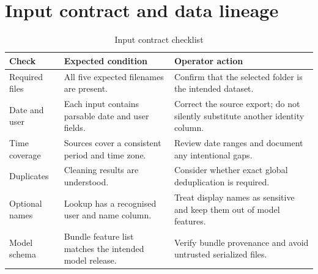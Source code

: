 \section{Input contract and data lineage}
\label{app:data-lineage}
\begin{table}[H]
\centering
\tablefont
\caption{Input contract checklist}
\label{tab:input-contract}
\begin{tabularx}{\textwidth}{|p{}|p{}|Y|}
\hline
\textbf{Check} & \textbf{Expected condition} & \textbf{Operator action}\\\hline
Required files & All five expected filenames are present. & Confirm that the selected folder is the intended dataset.\\\hline
Date and user & Each input contains parsable date and user fields. & Correct the source export; do not silently substitute another identity column.\\\hline
Time coverage & Sources cover a consistent period and time zone. & Review date ranges and document any intentional gaps.\\\hline
Duplicates & Cleaning results are understood. & Consider whether exact global deduplication is required.\\\hline
Optional names & Lookup has a recognised user and name column. & Treat display names as sensitive and keep them out of model features.\\\hline
Model schema & Bundle feature list matches the intended model release. & Verify bundle provenance and avoid untrusted serialized files.\\\hline
\end{tabularx}
\end{table}

